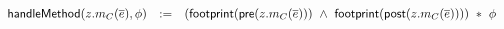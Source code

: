 %
%
%
\begin{spacing}{1.25} \begin{align*} \begin{array}{lcl}
\tsf{handleMethod}(z.m_C(\overline{e}), \phi) & :=
  & ( \tsf{footprint}( \tsf{pre}  (z.m_C(\overline{e})) ) \ \land \
      \tsf{footprint}( \tsf{post} (z.m_C(\overline{e})) ) ) \ \ast \
    \phi
%
\end{array} \end{align*} \end{spacing}
%

